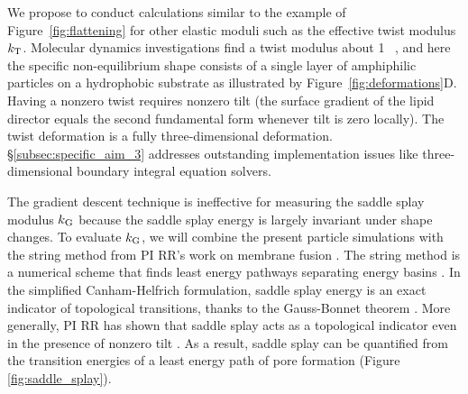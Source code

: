 We propose to conduct calculations similar to the example of Figure~\ref{fig:flattening} for other elastic moduli such as the effective twist modulus $k_{\mathrm{T}}$.
Molecular dynamics investigations find a twist modulus about 1
\kBT~\cite{LeVeWa14}, and here the specific non-equilibrium shape consists of
a single layer of amphiphilic particles on a hydrophobic substrate as
illustrated by Figure~\ref{fig:deformations}D. Having a nonzero twist
requires nonzero tilt (the surface gradient of the lipid
director equals the second fundamental form
whenever tilt is zero locally). The twist deformation is a fully
three-dimensional deformation. \S\ref{subsec:specific_aim_3} addresses outstanding implementation issues like three-dimensional boundary integral equation solvers.

%
The gradient descent technique is ineffective for measuring the saddle splay modulus $k_{\mathrm{G}}$ because
the saddle splay energy is largely invariant under shape changes.
To evaluate $k_{\mathrm{G}}$, we will combine the present particle simulations with the string method 
from PI RR's work on membrane fusion \cite{RyKlYaCo16}. The string method is a numerical scheme that finds
least energy pathways separating energy basins \cite{doi:10.1063/1.2720838}. 
In the simplified Canham-Helfrich formulation, saddle splay energy is an exact indicator of topological transitions, 
thanks to the  Gauss-Bonnet theorem \cite{TerziDeserno17}.
More generally, PI RR has shown that saddle splay acts as a topological indicator even in the presence of nonzero tilt \cite{RyKlYaCo16}. 
As a result, saddle splay can be quantified from the transition energies of a least energy path of pore formation (Figure \ref{fig:saddle_splay}).   
%
%


